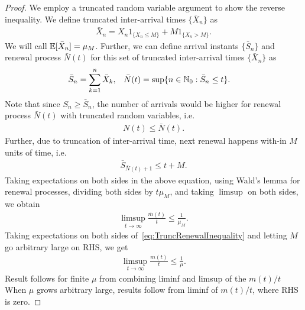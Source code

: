 \documentclass[a4paper,10pt, english]{article}
\begin{document}
\begin{proof}
We employ a truncated random variable argument to show the reverse inequality. We define truncated inter-arrival times $\{\bar{X}_n\}$ as 
\begin{align*}
\bar{X}_n = X_n 1_{\{X_n \leq M\}} + M1_{\{X_n > M\}}.
\end{align*}
We will call $\mathbb{E}[\bar{X}_n] = \mu_M$. Further, we can define arrival instants $\{\bar{S}_n\}$ and renewal process $\bar{N}(t)$ for this set of truncated inter-arrival times $\{\bar{X}_n\}$ as 
\begin{align*}
\bar{S}_n &= \sum_{k=1}^n \bar{X}_k, & \bar{N}(t) &= \sup\{n \in \mathbb{N}_0: \bar{S}_n \leq t\}.
\end{align*}
Note that since $S_n \geq \bar{S}_n$, the number of arrivals would be higher for renewal process $\bar{N}(t)$ with truncated random variables, i.e. 
\begin{align}
\label{eq:TruncRenewalInequality}
N(t) \leq \bar{N}(t).
\end{align}
Further, due to truncation of inter-arrival time, next renewal happens with-in $M$ units of time, i.e.
\begin{align*}
\bar{S}_{\bar{N}(t)+1} \leq t+M.
\end{align*}
Taking expectations on both sides in the above equation, using Wald's lemma for renewal processes, %
dividing both sides by $t \mu_M$, and taking $\limsup$ on both sides, we obtain
\begin{align*}
\limsup_{t \to \infty}\frac{\bar{m}(t)}{t} \leq \frac{1}{\mu_M}.
\end{align*}
Taking expectations on both sides of~\eqref{eq:TruncRenewalInequality} and letting $M$ go arbitrary large on RHS, we get
\begin{align*}
\limsup_{t \to \infty}\frac{m(t)}{t} \leq \frac{1}{\mu}.
\end{align*}
Result follows for finite $\mu$ from combining liminf and limsup of the $m(t)/t$
When $\mu$ grows arbitrary large, results follow from liminf of $m(t)/t$, %
where RHS is zero. 
\end{proof}
\end{document}
